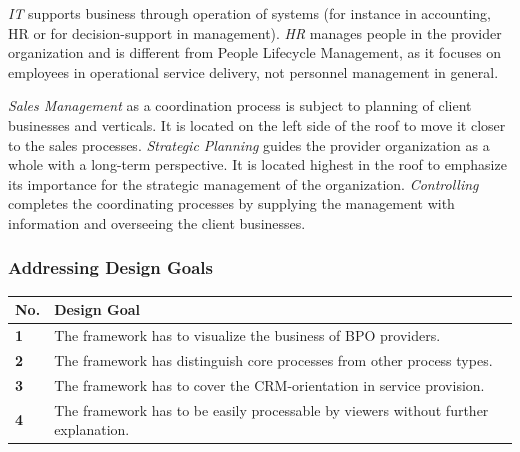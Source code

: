 	  \textit{IT} supports business through operation of systems (for instance in accounting, HR or for decision-support in management). \textit{HR} manages people in the provider organization and is different from People Lifecycle Management, as it focuses on  employees in operational service delivery, not personnel management in general. 
	  
	  \textit{Sales Management} as a coordination process is subject to planning of client businesses and verticals. It is located on the left side of the roof to move it closer to the sales processes. \textit{Strategic Planning} guides the provider organization as a whole with a long-term perspective. It is located highest in the roof to emphasize its importance for the strategic management of the organization. \textit{Controlling} completes the coordinating processes by supplying the management with information and overseeing the client businesses. 
	 	 
	 \subsubsection{Addressing  Design Goals}
	 
	 	 	\begin{table}[caption={Design Goals}, label={tab:desobj}]
	 	\centering
	 	\begin{tabular}{l p{13.3cm}}
	 		
	 		\textbf{No. }&\textbf{ Design Goal}
	 		\\ \hline
	 		\textbf{1 }                        & The framework has to visualize the business of BPO providers.                                     \\ \hline
	 		\textbf{2}                         & The framework has distinguish core processes from other process types.                                                                                                                   \\ \hline
	 		\textbf{3 }                        & The framework has to cover the CRM-orientation in service provision. \\ \hline
	 		\textbf{4}                         & The framework has to be easily processable by viewers without further explanation.                                                              
	 		
	 	\end{tabular}
	 \end{table}
 
